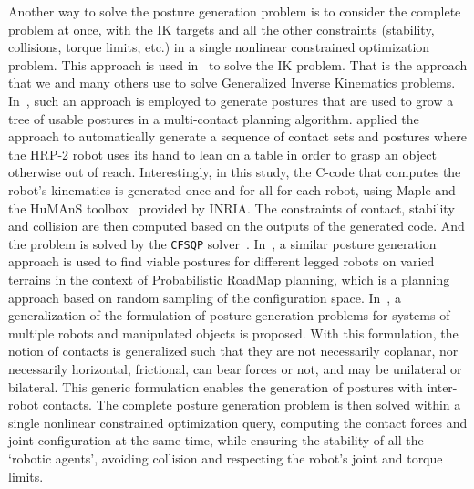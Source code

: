 Another way to solve the posture generation problem is to consider the complete problem at once, with the IK targets and all the other constraints (stability, collisions, torque limits, etc.) in a single nonlinear constrained optimization problem.
This approach is used in~\cite{Zhao1994} to solve the IK problem.
That is the approach that we and many others use to solve Generalized Inverse Kinematics problems.
In~\cite{escande:iros:2006}, such an approach is employed to generate postures that are used to grow a tree of usable postures in a multi-contact planning algorithm.
\cite{escande:iros:2006} applied the approach to automatically generate a sequence of contact sets and postures where the HRP-2 robot uses its hand to lean on a table in order to grasp an object otherwise out of reach.
Interestingly, in this study, the C-code that computes the robot's kinematics is generated once and for all for each robot, using Maple and the HuMAnS toolbox~\cite{wieber2006humans} provided by INRIA.
The constraints of contact, stability and collision are then computed based on the outputs of the generated code.
And the problem is solved by the {\tt CFSQP} solver~\cite{cfsqp:manual}.
In~\cite{hauser:ijrr:2008}, a similar posture generation approach is used to find viable postures for different legged robots on varied terrains in the context of Probabilistic RoadMap planning, which is a planning approach based on random sampling of the configuration space.
In~\cite{bouyarmane2010static}, a generalization of the formulation of posture generation problems for systems of multiple robots and manipulated objects is proposed.
With this formulation, the notion of contacts is generalized such that they are not necessarily coplanar, nor necessarily horizontal, frictional, can bear forces or not, and may be unilateral or bilateral.
This generic formulation enables the generation of postures with inter-robot contacts.
The complete posture generation problem is then solved within a single nonlinear constrained optimization query, computing the contact forces and joint configuration at the same time, while ensuring the stability of all the `robotic agents', avoiding collision and respecting the robot's joint and torque limits.

